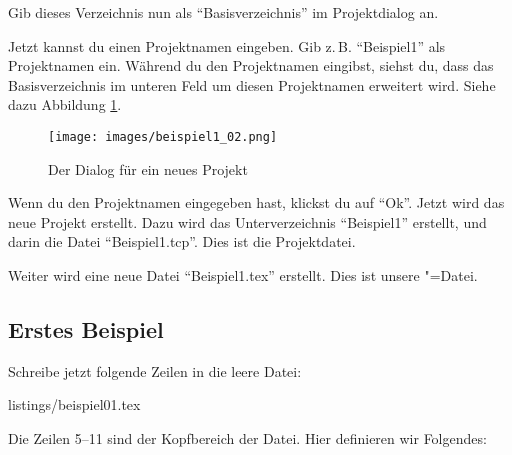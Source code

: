 Gib dieses Verzeichnis nun als \enquote{Basisverzeichnis} im Projektdialog an.

Jetzt kannst du einen Projektnamen eingeben. Gib z.\,B. \enquote{Beispiel1} als Projektnamen ein. Während du den Projektnamen eingibst, siehst du, dass das Basisverzeichnis im unteren Feld um diesen Projektnamen erweitert wird. Siehe dazu Abbildung \ref{fig:beispiel1_02}.

\begin{figure}[ht]
	\begin{center}
		\texttt{[image: images/beispiel1\_02.png]}
	\end{center}
	\caption{Der Dialog für ein neues Projekt}
	\label{fig:beispiel1_02}
\end{figure}

Wenn du den Projektnamen eingegeben hast, klickst du auf \enquote{Ok}. Jetzt wird das neue Projekt erstellt. Dazu wird das Unterverzeichnis \enquote{Beispiel1} erstellt, und darin die Datei \enquote{Beispiel1.tcp}. Dies ist die Projektdatei.

Weiter wird eine neue Datei \enquote{Beispiel1.tex} erstellt. Dies ist unsere \DMLLaTeX"=Datei.

\subsection{Erstes Beispiel}
\label{sec:erstesbeispiel}

Schreibe jetzt folgende Zeilen in die leere Datei:

%
	{listings/beispiel01.tex}

Die Zeilen 5--11 sind der Kopfbereich der Datei. Hier definieren wir Folgendes:

